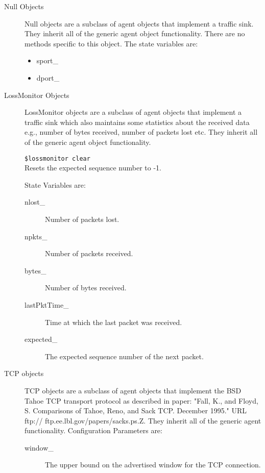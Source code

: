 \begin{description}

\item[Null Objects]
Null objects are a subclass of agent objects that implement a traffic
sink. They inherit all of the generic agent object functionality. There
are no methods specific to this object. The state variables are:
\begin{itemize}
\item sport\_
\item dport\_
\end{itemize}

\item[LossMonitor Objects]
LossMonitor objects are a subclass of agent objects that implement a
traffic sink which also maintains some statistics about the received data
e.g., number of bytes received, number of packets lost etc. They inherit
all of the generic agent object functionality. 

{\tt \$lossmonitor clear}\\
Resets the expected sequence number to -1. 

State Variables are:
\begin{description}
\item[nlost\_] Number of packets lost. 

\item[npkts\_] Number of packets received. 

\item[bytes\_] Number of bytes received. 

\item[lastPktTime\_] Time at which the last packet was received. 

\item[expected\_] The expected sequence number of the next packet. 
\end{description}

\item[TCP objects]
TCP objects are a subclass of agent objects that implement the BSD Tahoe
TCP transport protocol as described in paper: "Fall, K., and Floyd, S.
Comparisons of Tahoe, Reno, and Sack TCP. December 1995." URL ftp://
ftp.ee.lbl.gov/papers/sacks.ps.Z. They inherit
all of the generic agent functionality. Configuration Parameters are:
\begin{description}

\item[window\_] The upper bound on the advertised window for the TCP
connection. 


\end{description}
\end{description}
